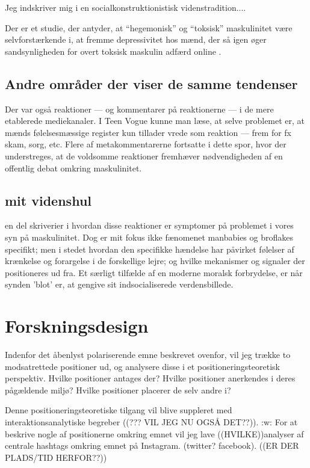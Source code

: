 Jeg indskriver mig i en socialkonstruktionistisk 
videnstradition....

Der er et studie, der antyder, at “hegemonisk” og “toksisk” 
maskulinitet være selvforstærkende i, at fremme depressivitet hos 
mænd, der så igen øger sandsynligheden for overt toksisk maskulin 
adfærd online \autocite{parentSocialMediaBehavior2018}.

\subsection{Andre områder der viser de samme tendenser} 

Der var også reaktioner — og kommentarer på reaktionerne — i de
mere etablerede mediekanaler. I Teen Vogue kunne man læse, at
selve problemet er, at mænds følelsesmæssige register kun tillader
vrede som reaktion — frem for fx skam, sorg, etc. Flere af
metakommentarerne fortsatte i dette spor, hvor der understreges,
at de voldsomme reaktioner fremhæver nødvendigheden af en
offentlig debat omkring maskulinitet. 

\subsection{mit videnshul}

en del skriverier i hvordan disse reaktioner er symptomer på
problemet i vores syn på maskulinitet. Dog er mit fokus ikke
fænomenet manbabies og broflakes specifikt; men i stedet hvordan
den specifikke hændelse har påvirket følelser af krænkelse og
forargelse i de forskellige lejre; og hvilke mekanismer og
signaler der positioneres ud fra. Et særligt tilfælde af en
moderne moralsk forbrydelse, er når synden 'blot' er, at gengive
sit indsocialiserede verdensbillede.

\section{Forskningsdesign} 

Indenfor det åbenlyst polariserende emne beskrevet ovenfor, vil
jeg trække to modsatrettede positioner ud, og analysere disse i et
positioneringsteoretisk perspektiv. Hvilke positioner antages
der? Hvilke positioner anerkendes i deres pågældende miljø? Hvilke
positioner placerer de selv andre i?

Denne positioneringsteoretiske tilgang vil blive suppleret med
interaktionsanalytiske begreber ((??? VIL JEG NU OGSÅ DET??)).
:w: For at beskrive nogle af positionerne omkring emnet vil jeg
lave ((HVILKE))analyser af centrale hashtags omkring emnet på
Instagram.   (twitter?  facebook). ((ER DER PLADS/TID HERFOR??))


